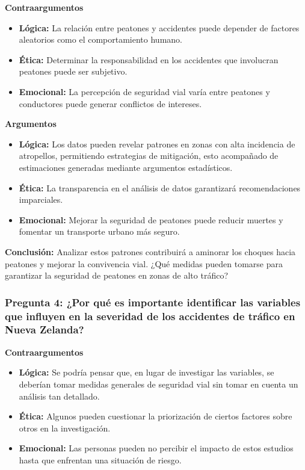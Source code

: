 \documentclass{book}
\begin{document}
\textbf{Contraargumentos}
\begin{itemize}
    \item \textbf{Lógica:} La relación entre peatones y accidentes puede depender de factores aleatorios como el comportamiento humano.
    \item \textbf{Ética:} Determinar la responsabilidad en los accidentes que involucran peatones puede ser subjetivo.
    \item \textbf{Emocional:} La percepción de seguridad vial varía entre peatones y conductores puede generar conflictos de intereses.
\end{itemize}

\textbf{Argumentos}
\begin{itemize}
    \item \textbf{Lógica:} Los datos pueden revelar patrones en zonas con alta incidencia de atropellos, permitiendo estrategias de mitigación, esto acompañado de estimaciones generadas mediante argumentos estadísticos.
    \item \textbf{Ética:} La transparencia en el análisis de datos garantizará recomendaciones imparciales.
    \item \textbf{Emocional:} Mejorar la seguridad de peatones puede reducir muertes y fomentar un transporte urbano más seguro.
\end{itemize}

\textbf{Conclusión:} Analizar estos patrones contribuirá a aminorar los choques hacia peatones y mejorar la convivencia vial. ¿Qué medidas pueden tomarse para garantizar la seguridad de peatones en zonas de alto tráfico?

\subsubsection{Pregunta 4: ¿Por qué es importante identificar las variables que influyen en la severidad de los accidentes de tráfico en Nueva Zelanda?}

\textbf{Contraargumentos}
\begin{itemize}
    \item \textbf{Lógica:} Se podría pensar que, en lugar de investigar las variables, se deberían tomar medidas generales de seguridad vial sin tomar en cuenta un análisis tan detallado.
    \item \textbf{Ética:} Algunos pueden cuestionar la priorización de ciertos factores sobre otros en la investigación.
    \item \textbf{Emocional:} Las personas pueden no percibir el impacto de estos estudios hasta que enfrentan una situación de riesgo.
\end{itemize}
\end{document}
